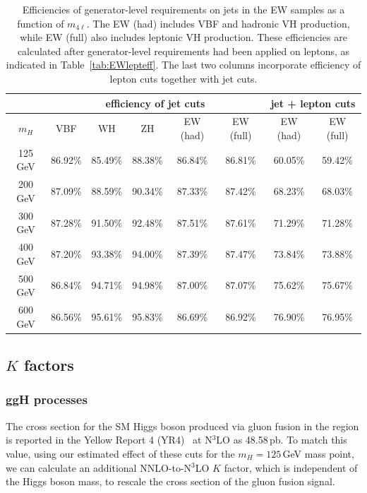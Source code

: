 \begin{table}[!hbt]
\begin{center}
\small
\begin{tabular}{|c|c|c|c|c|c|c|c|}
\hline
\multicolumn{1}{|c}{~} & \multicolumn{5}{|c|}{efficiency of jet cuts} & \multicolumn{2}{c|}{jet + lepton cuts} \\
\hline
$m_H$ & VBF & WH  & ZH  & EW (had) & EW (full)   & EW (had) & EW (full)          \\ 
\hline
125 GeV  & 86.92\%    & 85.49\%    & 88.38\%    & 86.84\%     & 86.81\%     & 60.05\%     & 59.42\%              \\ 
200 GeV  & 87.09\%    & 88.59\%    & 90.34\%    & 87.33\%     & 87.42\%     & 68.23\%     & 68.03\%             \\ 
300 GeV  & 87.28\%    & 91.50\%    & 92.48\%    & 87.51\%     & 87.61\%     & 71.29\%     & 71.28\%             \\ 
400 GeV  & 87.20\%    & 93.38\%    & 94.00\%    & 87.39\%     & 87.47\%     & 73.84\%     & 73.88\%             \\  
500 GeV  & 86.84\%    & 94.71\%    & 94.98\%    & 87.00\%     & 87.07\%     & 75.62\%     & 75.67\%              \\  
600 GeV  & 86.56\%    & 95.61\%    & 95.83\%    & 86.69\%     & 86.92\%     & 76.90\%     & 76.95\%              \\  
\hline
\end{tabular}
\caption{
Efficiencies of generator-level requirements on jets in the \offshell EW samples as a function of $m_{4\ell}$.
The EW (had) includes VBF and hadronic VH production, while EW (full) also includes leptonic VH production. 
These efficiencies are calculated after generator-level requirements had been applied on leptons,
as indicated in Table~\ref{tab:EWlepteff}.
The last two columns incorporate efficiency of lepton cuts together with jet cuts. 
}
\label{tab:EWjeteff}
\end{center}
\end{table}


\subsection{$K$ factors}

\subsubsection{ggH processes}

The cross section for the SM Higgs boson produced via gluon fusion in the \onshell region is reported in the Yellow Report 4 (YR4)~\cite{YellowRep4} at N$^3$LO as 48.58\,pb. To match this value, using our estimated effect of these cuts for the $m_H = 125$\,GeV mass point, we can calculate an additional NNLO-to-N$^3$LO $K$ factor, which is independent of the Higgs boson mass, to rescale the cross section of the \onshell gluon fusion signal.

